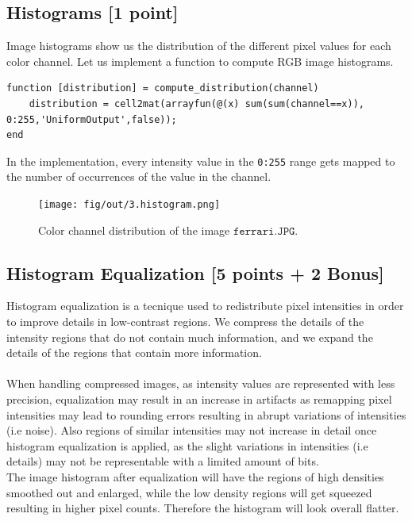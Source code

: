 \documentclass[tikz,14pt,fleqn]{article}
\begin{document}
\subsection{Histograms [1 point]}
Image histograms show us the distribution of the different pixel values for each color channel. Let us implement a function to compute RGB image histograms.
\begin{verbatim}
function [distribution] = compute_distribution(channel)
    distribution = cell2mat(arrayfun(@(x) sum(sum(channel==x)), 0:255,'UniformOutput',false));
end
\end{verbatim}
In the implementation, every intensity value in the \verb|0:255| range gets mapped to the number of occurrences of the value in the channel.
\begin{figure}[h!]
    \centering
    \texttt{[image: fig/out/3.histogram.png]}
    \caption{Color channel distribution of the image $\texttt{ferrari.JPG}$.}
\end{figure}
\subsection{Histogram Equalization [5 points + 2 Bonus]}
Histogram equalization is a tecnique used to redistribute pixel intensities in order to improve details in low-contrast regions. We compress the details of the intensity regions that do not contain much information, and we expand the details of the regions that contain more information.\\\\
When handling compressed images, as intensity values are represented with less precision, equalization may result in an increase in artifacts as remapping pixel intensities may lead to rounding errors resulting in abrupt variations of intensities (i.e noise). Also regions of similar intensities may not increase in detail once histogram equalization is applied, as the slight variations in intensities (i.e details) may not be representable with a limited amount of bits.\\
The image histogram after equalization will have the regions of high densities smoothed out and enlarged, while the low density regions will get squeezed resulting in higher pixel counts. Therefore the histogram will look overall flatter.
\end{document}
